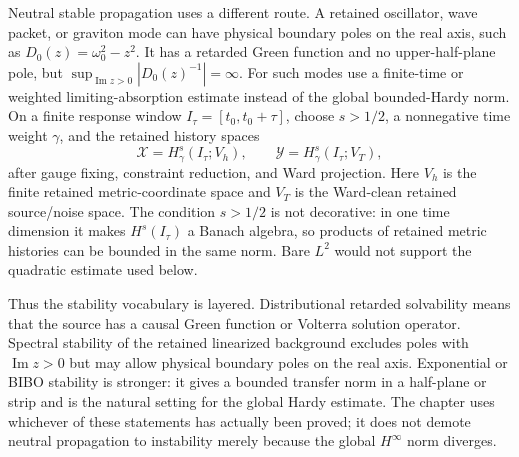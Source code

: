 \begin{controlledapproximation}
Neutral stable propagation uses a different route.  A retained oscillator,
wave packet, or graviton mode can have physical boundary poles on the real
axis, such as \(D_0(z)=\omega_0^2-z^2\).  It has a retarded Green function and
no upper-half-plane pole, but
\(\sup_{\operatorname{Im}z>0}|D_0(z)^{-1}|=\infty\).  For such modes use a
finite-time or weighted limiting-absorption estimate instead of the global
bounded-Hardy norm.  On a finite response window \(I_\tau=[t_0,t_0+\tau]\),
choose \(s>1/2\), a nonnegative time weight \(\gamma\), and the retained
history spaces
\begin{equation}
  \mathcal X
  =
  H^s_\gamma(I_\tau;V_h),
  \qquad
  \mathcal Y
  =
  H^s_\gamma(I_\tau;V_T),
  \label{eq:semiclassical-history-spaces}
\end{equation}
after gauge fixing, constraint reduction, and Ward projection.  Here \(V_h\)
is the finite retained metric-coordinate space and \(V_T\) is the Ward-clean
retained source/noise space.  The condition \(s>1/2\) is not decorative:
in one time dimension it makes \(H^s(I_\tau)\) a Banach algebra, so products
of retained metric histories can be bounded in the same norm.  Bare \(L^2\)
would not support the quadratic estimate used below.

Thus the stability vocabulary is layered.  Distributional retarded
solvability means that the source has a causal Green function or Volterra
solution operator.  Spectral stability of the retained linearized background
excludes poles with \(\operatorname{Im}z>0\) but may allow physical boundary
poles on the real axis.  Exponential or BIBO stability is stronger: it gives a
bounded transfer norm in a half-plane or strip and is the natural setting for
the global Hardy estimate.  The chapter uses whichever of these statements has
actually been proved; it does not demote neutral propagation to instability
merely because the global \(H^\infty\) norm diverges.


\end{controlledapproximation}
